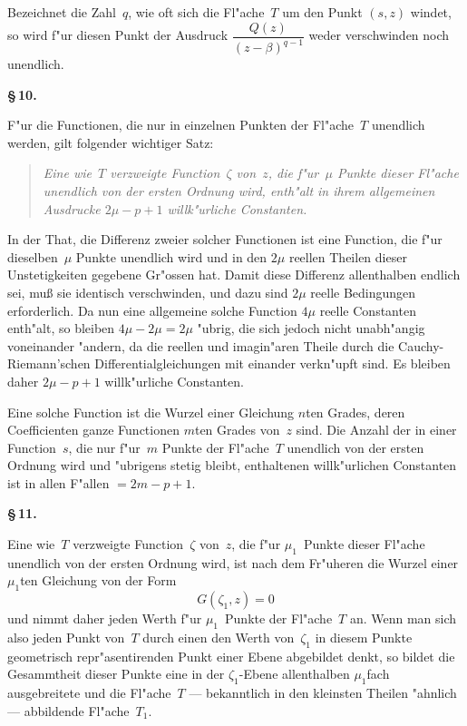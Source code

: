 \documentclass[12pt,a4paper]{article}
\begin{document}
Bezeichnet die Zahl~$q$, wie oft sich die Fl"ache~$T$ um den Punkt
$(s,z)$ windet, so wird f"ur diesen Punkt der Ausdruck
$\dfrac{Q(z)}{(z-\beta)^{q-1}}$ weder verschwinden noch unendlich.

\medskip
\textbf{\S\,10.}

F"ur die Functionen, die nur in einzelnen Punkten der Fl"ache~$T$
unendlich werden, gilt folgender wichtiger Satz:

\begin{quote}
\textit{Eine wie~$T$ verzweigte Function~$\zeta$ von~$z$, die f"ur~$\mu$ Punkte
dieser Fl"ache unendlich von der ersten Ordnung wird, enth"alt in ihrem
allgemeinen Ausdrucke $2\mu - p + 1$ willk"urliche Constanten.}
\end{quote}

In der That, die Differenz zweier solcher Functionen ist eine Function,
die f"ur dieselben~$\mu$ Punkte unendlich wird und in den $2\mu$ reellen
Theilen dieser Unstetigkeiten gegebene Gr"ossen hat. Damit diese Differenz
allenthalben endlich sei, mu\ss{} sie identisch verschwinden, und dazu sind
$2\mu$ reelle Bedingungen erforderlich. Da nun eine allgemeine solche
Function $4\mu$ reelle Constanten enth"alt, so bleiben $4\mu - 2\mu = 2\mu$
"ubrig, die sich jedoch nicht unabh"angig voneinander "andern, da die
reellen und imagin"aren Theile durch die Cauchy-Riemann'schen
Differentialgleichungen mit einander verkn"upft sind. Es bleiben daher
$2\mu - p + 1$ willk"urliche Constanten.

Eine solche Function ist die Wurzel einer Gleichung $n$ten Grades,
deren Coefficienten ganze Functionen $m$ten Grades von~$z$ sind. Die
Anzahl der in einer Function~$s$, die nur f"ur~$m$ Punkte der Fl"ache~$T$
unendlich von der ersten Ordnung wird und "ubrigens stetig bleibt,
enthaltenen willk"urlichen Constanten ist in allen F"allen $= 2m - p + 1$.

\medskip
\textbf{\S\,11.}

Eine wie~$T$ verzweigte Function~$\zeta$ von~$z$, die f"ur $\mu_1$~Punkte
dieser Fl"ache unendlich von der ersten Ordnung wird, ist nach dem
Fr"uheren die Wurzel einer $\mu_1$ten Gleichung von der Form
\[
G(\zeta_1, z) = 0
\]
und nimmt daher jeden Werth f"ur $\mu_1$~Punkte der Fl"ache~$T$ an. Wenn
man sich also jeden Punkt von~$T$ durch einen den Werth von~$\zeta_1$ in
diesem Punkte geometrisch repr"asentirenden Punkt einer Ebene abgebildet
denkt, so bildet die Gesammtheit dieser Punkte eine in der
$\zeta_1$-Ebene allenthalben $\mu_1$fach ausgebreitete und die Fl"ache~$T$
--- bekanntlich in den kleinsten Theilen "ahnlich --- abbildende Fl"ache~$T_1$.
\end{document}

